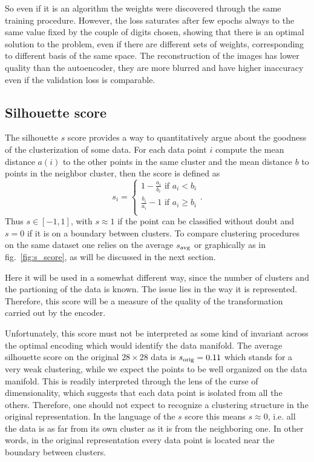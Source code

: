 \documentclass[twocolumn,gsifonts,twoside]{gsipaper}
\begin{document}
So even if it is an algorithm the weights were discovered through the same training procedure. However, the loss saturates after few epochs always to the same value fixed by the couple of digits chosen, showing that there is an optimal solution to the problem, even if there are different sets of weights, corresponding to different basis of the same space.
The reconstruction of the images has lower quality than the autoencoder, they are more blurred and have higher inaccuracy even if the validation loss is comparable.

\subsection{Silhouette score}
The silhouette $s$ score \cite{Rousseeuw1987} provides a way to quantitatively argue about the goodness of the clusterization of some data. For each data point $i$ compute the mean distance $a(i)$ to the other points in the same cluster and the mean distance $b$ to points in the neighbor cluster, then the score is defined as
\[
s_i = 
\begin{cases}
  1 - \frac{a_i}{b_i} \text{ if } a_i < b_i \\
  \frac{b_i}{a_i} - 1 \text{ if } a_i \ge b_i \\
\end{cases}.
\]
Thus $s\in[-1,1]$, with $s\approx1$ if the point can be classified without doubt and $s=0$ if it is on a boundary between clusters. To compare clustering procedures on the same dataset one relies on the average $s_\textup{avg}$ or graphically as in fig.~\ref{fig:s_score}, as will be discussed in the next section.

Here it will be used in a somewhat different way, since the number of clusters and the partioning of the data is known. The issue lies in the way it is represented. Therefore, this score will be a measure of the quality of the transformation carried out by the encoder.

Unfortunately, this score must not be interpreted as some kind of invariant across the optimal encoding which would identify the data manifold. The average silhouette score on the original $28\times28$ data is $s_\textup{orig} = 0.11$ which stands for a very weak clustering, while we expect the points to be well organized on the data manifold. This is readily interpreted through the lens of the curse of dimensionality, which suggests that each data point is isolated from all the others. Therefore, one should not expect to recognize a clustering structure in the original representation. In the language of the $s$ score this means $s\approx0$, i.e. all the data is as far from its own cluster as it is from the neighboring one. In other words, in the original representation every data point is located near the boundary between clusters.
\end{document}
